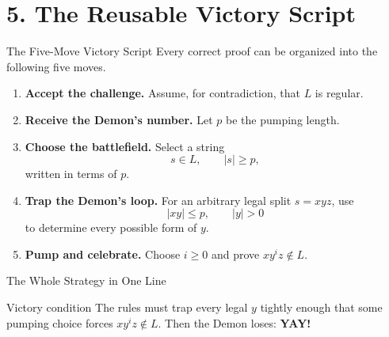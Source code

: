 \documentclass[10pt,aspectratio=169]{beamer}
\newcommand{\Demon}{\textbf{\alert{Demon}}}
\newcommand{\Me}{\textbf{\color{blue!70!black}Me}}
\begin{document}
\section{5. The Reusable Victory Script}

\begin{frame}{The Five-Move Victory Script}
\small
Every correct proof can be organized into the following five moves.

\begin{enumerate}
    \item \textbf{Accept the challenge.}
          Assume, for contradiction, that $L$ is regular.

    \item \textbf{Receive the Demon's number.}
          Let $p$ be the pumping length.

    \item \textbf{Choose the battlefield.}
          Select a string
          \[
          s\in L,
          \qquad |s|\geq p,
          \]
          written in terms of $p$.

    \item \textbf{Trap the Demon's loop.}
          For an arbitrary legal split $s=xyz$, use
          \[
          |xy|\leq p,
          \qquad |y|>0
          \]
          to determine every possible form of $y$.

    \item \textbf{Pump and celebrate.}
          Choose $i\geq 0$ and prove $xy^iz\notin L$.
\end{enumerate}
\end{frame}

\begin{frame}{The Whole Strategy in One Line}
\small
\begin{center}
\end{center}

\vspace{0.8em}
\begin{block}{Victory condition}
The rules must trap every legal $y$ tightly enough that some pumping
choice forces $xy^iz\notin L$. Then the Demon loses: \alert{\textbf{YAY!}}
\end{block}
\end{frame}
\end{document}
